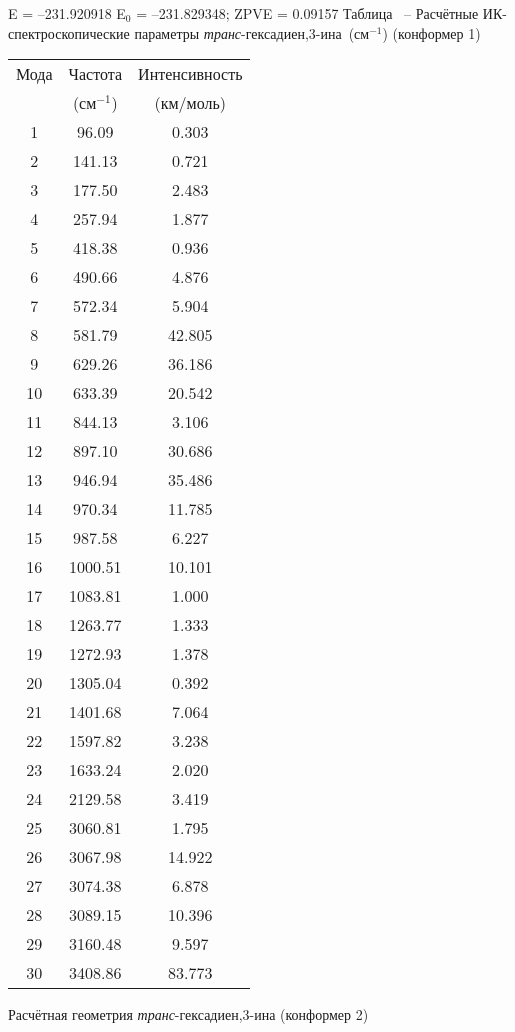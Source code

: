 {E =  --231.920918    E$_0$ =  --231.829348; ZPVE = 0.09157 
\newpage {}
Таблица \thet\, -- Расчётные ИК-спектроскопические параметры {\itshape транс}-гексадиен,3\nobreakdash-ина~(см$^{-1}$) (конформер 1)
 \begin{center}
\begin{tabular}{ccc}
Мода & Частота   & Интенсивность \\
&(см$^{-1}$)&(км/моль)\\
 \hline
    1 &   96.09 &    0.303 \\
     2 &  141.13 &   0.721 \\
     3 &  177.50 &    2.483 \\
     4 &  257.94 &    1.877 \\
     5 &  418.38 &    0.936 \\
     6 &  490.66 &   4.876 \\
     7 &  572.34 &  5.904 \\
     8 &  581.79 &   42.805 \\
     9 &  629.26 &   36.186 \\
    10 &  633.39 &   20.542 \\
    11 &  844.13 &   3.106 \\
    12 &  897.10 &  30.686 \\
    13 &  946.94 &  35.486 \\
    14 &  970.34 &   11.785 \\
    15 &  987.58 &    6.227 \\
    16 & 1000.51 &  10.101 \\
    17 & 1083.81 &    1.000 \\
    18 & 1263.77 &    1.333 \\
    19 & 1272.93 &    1.378 \\
    20 & 1305.04 &    0.392 \\
    21 & 1401.68 &    7.064 \\
    22 & 1597.82 &   3.238 \\
    23 & 1633.24 &    2.020 \\
    24 & 2129.58 &    3.419 \\
    25 & 3060.81 &    1.795 \\
    26 & 3067.98 &   14.922 \\
   27 & 3074.38 &     6.878 \\
    28 & 3089.15 &   10.396 \\
    29 & 3160.48 &    9.597 \\
    30 & 3408.86 &   83.773 \\
  \end{tabular}
\end{center}
\newpage
Расчётная геометрия {\itshape транс}-гексадиен,3\nobreakdash-ина (конформер 2)

}
